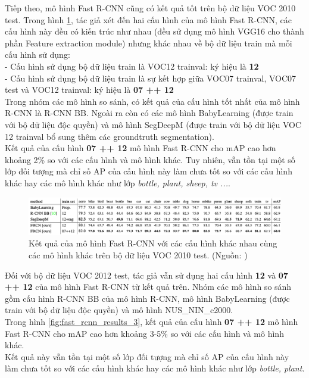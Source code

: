 {    \noindent
    Tiếp theo, mô hình Fast R-CNN cũng có kết quả tốt trên bộ dữ liệu VOC 2010 test.
    Trong hình \ref{fig:fast_rcnn_results_2}, tác giả xét đến hai cấu hình của mô hình Fast R-CNN, các cấu hình này đều có kiến trúc như nhau (đều sử dụng mô hình VGG16 cho thành phần Feature extraction module) nhưng khác nhau về bộ dữ liệu train mà mỗi cấu hình sử dụng: \\
    - Cấu hình sử dụng bộ dữ liệu train là VOC12 trainval: ký hiệu là \textbf{12} \\
    - Cấu hình sử dụng bộ dữ liệu train là sự kết hợp giữa VOC07 trainval, VOC07 test và VOC12 trainval: ký hiệu là \textbf{07 ++ 12} \\
    Trong nhóm các mô hình so sánh, có kết quả của cấu hình tốt nhất của mô hình R-CNN là R-CNN BB.
    Ngoài ra còn có các mô hình BabyLearning (được train với bộ dữ liệu độc quyền) và mô hình SegDeepM (được train với bộ dữ liệu VOC 12 trainval bổ sung thêm các groundtruth segmentation). \\
    Kết quả của cấu hình \textbf{07 ++ 12} mô hình Fast R-CNN cho mAP cao hơn khoảng 2\% so với các cấu hình và mô hình khác.
    Tuy nhiên, vẫn tồn tại một số lớp đối tượng mà chỉ số AP của cấu hình này làm chưa tốt so với các cấu hình khác hay các mô hình khác như lớp \textit{bottle, plant, sheep, tv ...}.

    \begin{figure}[H]
        \centering
        \includegraphics[width=15cm] {images/fast_rcnn_results_2}
        \caption{Kết quả của mô hình Fast R-CNN với các cấu hình khác nhau cùng các mô hình khác trên bộ dữ liệu VOC 2010 test. (Nguồn: \cite{girshick2015fast})}
        \label{fig:fast_rcnn_results_2}
    \end{figure}

    \noindent
    Đối với bộ dữ liệu VOC 2012 test, tác giả vẫn sử dụng hai cấu hình \textbf{12} và \textbf{07 ++ 12} của mô hình Fast R-CNN từ kết quả trên. Nhóm các mô hình so sánh gồm cấu hình R-CNN BB của mô hình R-CNN, mô hình BabyLearning (được train với bộ dữ liệu độc quyền) và mô hình NUS\_NIN\_c2000. \\
    Trong hình \ref{fig:fast_rcnn_results_3}, kết quả của cấu hình \textbf{07 ++ 12} mô hình Fast R-CNN cho mAP cao hơn khoảng 3-5\% so với các cấu hình và mô hình khác. \\
    Kết quả này vẫn tồn tại một số lớp đối tượng mà chỉ số AP của cấu hình này làm chưa tốt so với các cấu hình khác hay các mô hình khác như lớp \textit{bottle, plant}.

}
